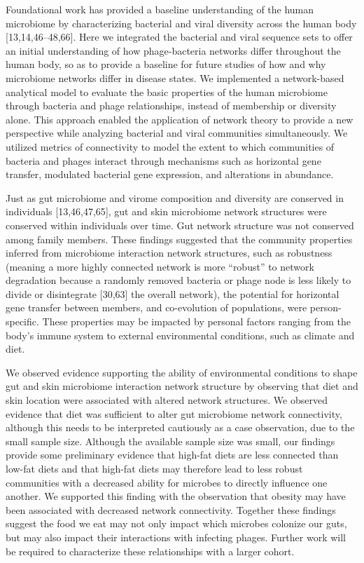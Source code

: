 \documentclass[12pt,]{article}
\begin{document}
Foundational work has provided a baseline understanding of the human
microbiome by characterizing bacterial and viral diversity across the
human body {[}13,14,46--48,66{]}. Here we integrated the bacterial and
viral sequence sets to offer an initial understanding of how
phage-bacteria networks differ throughout the human body, so as to
provide a baseline for future studies of how and why microbiome networks
differ in disease states. We implemented a network-based analytical
model to evaluate the basic properties of the human microbiome through
bacteria and phage relationships, instead of membership or diversity
alone. This approach enabled the application of network theory to
provide a new perspective while analyzing bacterial and viral
communities simultaneously. We utilized metrics of connectivity to model
the extent to which communities of bacteria and phages interact through
mechanisms such as horizontal gene transfer, modulated bacterial gene
expression, and alterations in abundance.

Just as gut microbiome and virome composition and diversity are
conserved in individuals {[}13,46,47,65{]}, gut and skin microbiome
network structures were conserved within individuals over time. Gut
network structure was not conserved among family members. These findings
suggested that the community properties inferred from microbiome
interaction network structures, such as robustness (meaning a more
highly connected network is more ``robust'' to network degradation
because a randomly removed bacteria or phage node is less likely to
divide or disintegrate {[}30,63{]} the overall network), the potential
for horizontal gene transfer between members, and co-evolution of
populations, were person-specific. These properties may be impacted by
personal factors ranging from the body's immune system to external
environmental conditions, such as climate and diet.

We observed evidence supporting the ability of environmental conditions
to shape gut and skin microbiome interaction network structure by
observing that diet and skin location were associated with altered
network structures. We observed evidence that diet was sufficient to
alter gut microbiome network connectivity, although this needs to be
interpreted cautiously as a case observation, due to the small sample
size. Although the available sample size was small, our findings provide
some preliminary evidence that high-fat diets are less connected than
low-fat diets and that high-fat diets may therefore lead to less robust
communities with a decreased ability for microbes to directly influence
one another. We supported this finding with the observation that obesity
may have been associated with decreased network connectivity. Together
these findings suggest the food we eat may not only impact which
microbes colonize our guts, but may also impact their interactions with
infecting phages. Further work will be required to characterize these
relationships with a larger cohort.
\end{document}
